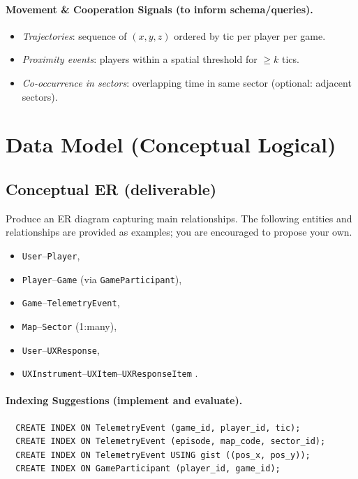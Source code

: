 \documentclass[11pt]{article}
\begin{document}
\paragraph{Movement \& Cooperation Signals (to inform schema/queries).}
\begin{itemize}[leftmargin=*]
  \item \emph{Trajectories}: sequence of $(x,y,z)$ ordered by tic per player per game.
  \item \emph{Proximity events}: players within a spatial threshold for $\geq k$ tics.
  \item \emph{Co-occurrence in sectors}: overlapping time in same sector (optional:
  adjacent sectors).
\end{itemize}

\section{Data Model (Conceptual \textrightarrow Logical)}

\subsection*{Conceptual ER (deliverable)}
Produce an ER diagram capturing main relationships.  The following entities and relationships are provided as examples; you are encouraged to propose your own.

  \begin{itemize}
    \item \texttt{User}--\texttt{Player},
    \item \texttt{Player}--\texttt{Game} (via \texttt{GameParticipant}),
    \item \texttt{Game}--\texttt{TelemetryEvent},
    \item \texttt{Map}--\texttt{Sector} (1:many),
    \item \texttt{User}--\texttt{UXResponse},
    \item \texttt{UXInstrument}--\texttt{UXItem}--\texttt{UXResponseItem} .
  \end{itemize}

\paragraph{Indexing Suggestions (implement and evaluate).}
\begin{verbatim}
  CREATE INDEX ON TelemetryEvent (game_id, player_id, tic);
  CREATE INDEX ON TelemetryEvent (episode, map_code, sector_id);
  CREATE INDEX ON TelemetryEvent USING gist ((pos_x, pos_y));
  CREATE INDEX ON GameParticipant (player_id, game_id);
\end{verbatim}
\end{document}
